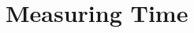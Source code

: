 \documentclass[14pt,aspectratio=1610, hyperref={pdfpagelayout=SinglePage}]{beamer}
\begin{document}



\section{Measuring Time}

\end{document}
